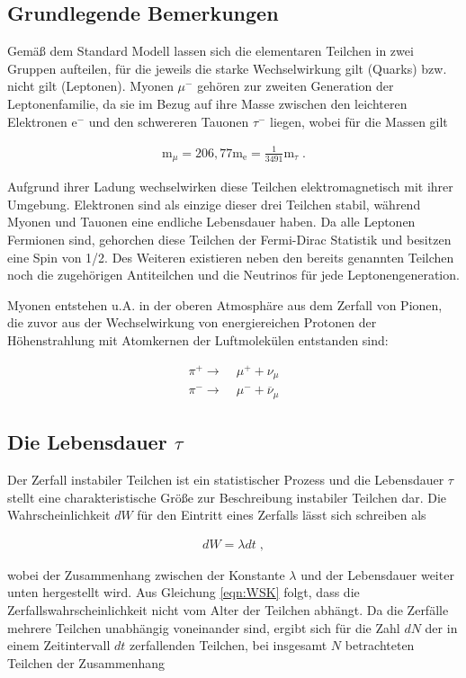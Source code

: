 \subsection{Grundlegende Bemerkungen}
Gemäß dem Standard Modell lassen sich die elementaren Teilchen in zwei Gruppen aufteilen, für die jeweils die starke Wechselwirkung gilt (Quarks) bzw. nicht gilt (Leptonen). Myonen $\mu^-$ gehören zur zweiten Generation der Leptonenfamilie, da sie im Bezug auf ihre Masse zwischen den leichteren Elektronen $\textrm{e}^-$ und den schwereren Tauonen $\tau^-$ liegen, wobei für die Massen gilt

\begin{align}
\textrm{m}_\mu = 206,77 \textrm{m}_{\textrm{e}} = \frac{1}{3491}\textrm{m}_{\tau}\;.
\end{align}

Aufgrund ihrer Ladung wechselwirken diese Teilchen elektromagnetisch mit ihrer Umgebung. Elektronen sind als einzige dieser drei Teilchen stabil, während Myonen und Tauonen eine endliche Lebensdauer haben. Da alle Leptonen Fermionen sind, gehorchen diese Teilchen der Fermi-Dirac Statistik und besitzen eine Spin von 1/2. Des Weiteren existieren neben den bereits genannten Teilchen noch die zugehörigen Antiteilchen und die Neutrinos für jede Leptonengeneration.

Myonen entstehen u.A. in der oberen Atmosphäre aus dem Zerfall von Pionen, die zuvor aus der Wechselwirkung von energiereichen Protonen der Höhenstrahlung mit Atomkernen der Luftmolekülen entstanden sind:

\begin{align}
\pi^+ \longrightarrow &\; \mu^+ + \nu_\mu \\
\pi^- \longrightarrow &\; \mu^- + \overline{\nu}_\mu 
\end{align}

\subsection{Die Lebensdauer $\tau$}
Der Zerfall instabiler Teilchen ist ein statistischer Prozess und die Lebensdauer $\tau$ stellt eine charakteristische Größe zur Beschreibung instabiler Teilchen dar. Die Wahrscheinlichkeit $dW$ für den Eintritt eines Zerfalls lässt sich schreiben als
 
\begin{align}
dW = \lambda dt \;, \label{eqn:WSK}
\end{align}

wobei der Zusammenhang zwischen der Konstante $\lambda$ und der Lebensdauer weiter unten hergestellt wird. Aus Gleichung \eqref{eqn:WSK} folgt, dass die Zerfallswahrscheinlichkeit nicht vom Alter der Teilchen abhängt. Da die Zerfälle mehrere Teilchen unabhängig voneinander sind, ergibt sich für die Zahl $dN$ der in einem Zeitintervall $dt$ zerfallenden Teilchen, bei insgesamt $N$ betrachteten Teilchen der Zusammenhang


